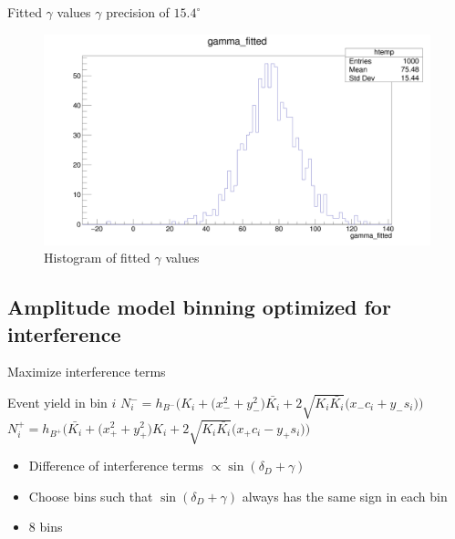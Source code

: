 \documentclass{beamer}
\begin{document}
\begin{frame}{Fitted $\gamma$ values}
  $\gamma$ precision of $15.4^\circ$
  \begin{figure}
    \centering
    \includegraphics[width = 1.0\textwidth]{AmplitudePulls/gammafitted1K1K.png}
    \caption{Histogram of fitted $\gamma$ values}
  \end{figure}
\end{frame}

\subsection{Amplitude model binning optimized for interference}
\begin{frame}{Maximize interference terms}
  \begin{block}{Event yield in bin $i$}
    $N^-_i = h_{B^-}\Big(K_i + \big(x_-^2 + y_-^2\big)\bar{K_i} + 2\sqrt{K_i\bar{K_i}}\big(x_-c_i + y_-s_i\big)\Big)$
    $N^+_i = h_{B^+}\Big(\bar{K_i} + \big(x_+^2 + y_+^2\big)K_i + 2\sqrt{K_i\bar{K_i}}\big(x_+c_i - y_+s_i\big)\Big)$
  \end{block}
  \begin{itemize}
    \item{Difference of interference terms $\propto\sin(\delta_D + \gamma)$}
    \item{Choose bins such that $\sin(\delta_D + \gamma)$ always has the same sign in each bin}
    \item{$8$ bins}
  \end{itemize}
\end{frame}
\end{document}
